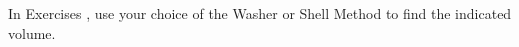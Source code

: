 {\noindent In Exercises}
{, use your choice of the Washer or Shell Method to find the indicated volume.}
